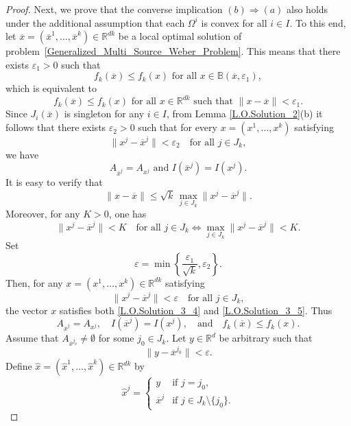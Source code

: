 \documentclass[10pt,a4paper]{amsart}
\def\Hat{\widehat}
\begin{document}
\begin{proof}
	
	Next, we prove that the converse implication $(b)\Rightarrow(a)$ also holds under the additional assumption that each $\Omega^i$ is convex for all $i\in I$. To this end, let $\overline{x}=(\overline{x}^1,\dots,\overline{x}^k)\in \mathbb{R}^{dk}$ be a local optimal solution of problem~\eqref{Generalized_Multi_Source_Weber_Problem}. This means that there exists $\varepsilon_1>0$ such that
	\[
	f_k(\overline{x})\leq f_k(x) \text{ for all } x \in \mathbb{B}(\overline{x},\varepsilon_1),
	\]
	which is equivalent to
	\begin{equation}
		\label{L.O.Solution_3_4}
		f_k(\overline{x})\leq f_k(x) \text{ for all } x\in \mathbb{R}^{dk} \text{ such that } \|x-\overline{x}\|<\varepsilon_1.
	\end{equation}
	Since $J_i(\overline{x})$ is singleton for any $i \in I$, from Lemma \ref{L.O.Solution_2}(b) it follows that there exists $\varepsilon_2>0$ such that for every $x = (x^1,\dots,x^k)$ satisfying
    \[
    \|x^j-\overline{x}^j\|<\varepsilon_2\quad \text{for all }j \in J_k,
    \]
    we have
	\begin{equation}
		\label{L.O.Solution_3_5}
		A_{\overline{x}^j}=A_{x^j} \text{ and } I(\overline{x}^j)=I(x^j).
	\end{equation}
	It is easy to verify that
	\[
	\|x-\overline{x}\|\leq \sqrt{k}\,\max_{j\in J_k}\|x^j-\overline{x}^j\|.
	\]
	Moreover, for any $K>0$, one has
	\[
	\|x^j-\overline{x}^j\|<K \quad \text{for all } j \in J_k
	\Longleftrightarrow
	\max_{j\in J_k}\|x^j-\overline{x}^j\|<K.
	\]
	Set
	\[
	\varepsilon=\min\left\{\frac{\varepsilon_1}{\sqrt{k}},\varepsilon_2\right\}.
	\]
	Then, for any $x=(x^1,\dots,x^k)\in \mathbb{R}^{dk}$ satisfying
	\[
	\|x^j-\overline{x}^j\|<\varepsilon \quad \text{for all } j \in J_k,
	\]
	the vector $x$ satisfies both \eqref{L.O.Solution_3_4} and \eqref{L.O.Solution_3_5}. Thus
	\begin{equation}
		\label{L.O.Solution_3_6}
		A_{\overline{x}^j}=A_{x^j},\quad I(\overline{x}^j)=I(x^j),\quad\text{and}\quad     f_k(\overline{x})\leq f_k(x).
	\end{equation}
	Assume that $A_{\overline{x}^{j_0}} \neq \emptyset$ for some $j_0 \in J_k$. Let $y \in \mathbb{R}^d$ be arbitrary such that
	\[
	\|y-\overline{x}^{j_0}\|<\varepsilon.
	\]
	Define $\Hat{x}=(\Hat{x}^1,\dots,\Hat{x}^k)\in \mathbb{R}^{dk}$ by
    \begin{equation}
    \label{Hat_x_def}
    	\Hat{x}^j=
	\begin{cases}
		y & \text{if } j=j_0,\\
		\overline{x}^j & \text{if } j \in J_k\setminus\{j_0\}.

\end{cases}
\end{equation}
\end{proof}
\end{document}
